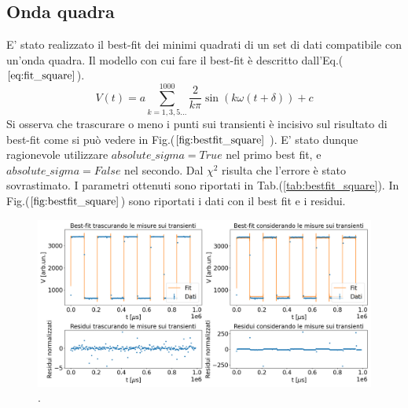 \documentclass{article}
\begin{document}
    \subsection{Onda quadra}
            E' stato realizzato il best-fit dei minimi quadrati
            di un set di dati compatibile con un'onda quadra.
            Il modello con cui fare il best-fit è descritto dall'Eq.($\ref{eq:fit_square}$).
                \begin{equation}
                    V(t) = a\sum_{k=1,3,5...}^{1000} \frac{2}{k\pi}\sin\left(k\omega (t+\delta)\right) +c
                    \label{eq:fit_square}
                \end{equation}
            Si osserva che trascurare o meno i punti sui transienti è incisivo
            sul risultato di best-fit come si può vedere in Fig.($\ref{fig:bestfit_square}$ ).
            E' stato dunque ragionevole utilizzare $absolute\_ sigma=True$
            nel primo best fit, e $absolute\_ sigma=False$ nel secondo.
            Dal $\chi^2$ risulta che l'errore è stato sovrastimato. 
            I parametri ottenuti sono riportati in Tab.(\ref{tab:bestfit_square}).
            In Fig.($\ref{fig:bestfit_square}$) sono riportati i dati con il best fit e 
            i residui.
            

            \begin{figure}[H]
                \centering
                \includegraphics[width=1\textwidth]{bestfit_squarewave.png} %
                \caption{.
                }
                \label{fig:bestfit_square}
            \end{figure}     
            
\end{document}
